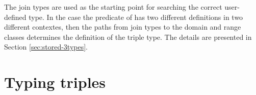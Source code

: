 \documentclass[runningheads]{llncs}
\newcommand{\memo}[1]{}
\newcommand{\notes}[1]{\noindent\begin{small}-- \emph{#1}\hfill\break\end{small}}
\newcommand{\nnotes}[1]{\indent\begin{small}-- \emph{#1}\hfill\break\end{small}}
\begin{document}
The join types are used as the starting point for searching the
correct user-defined type. In the case the predicate of has two
different definitions in two different contextes, then the paths from
join types to the domain and range classes determines the definition
of the triple type. The details are presented in Section
\ref{sec:stored-3types}.


\memo{

\notes{Example from a KG.}
\notes{Let's have a look at $\sqcup$ types of $I$'s ground types $S_1..S_n$ from a KG. }
\nnotes{In many cases $I$ has a single type $S_1$ which is the same as the join type $S$.}
\nnotes{The super-classes of the join type $S$ have to be part of stored triple types}
\nnotes{to be selected as the types of subject or object.}
\nnotes{Often join type $S$ is close to the classes that are components of stored triple types.}
\notes{Can the situation with two super-predicates of a predicate $p$ lead to two different definitions of $p$?}}












\section{Typing triples\label{sec:triples}}
\end{document}
